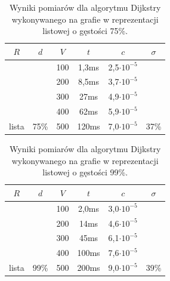 \documentclass[a4paper,12pt]{article}
\begin{document}
\begin{table}[H]
	\centering
	\caption{\centering Wyniki pomiarów dla algorytmu Dijkstry wykonywanego na grafie w reprezentacji listowej o gęstości 75\%.}
	\begin{tabular}{|c|c|c|c|c|c|}
		\hline
		\rowcolor[HTML]{C0C0C0} 
		$R$                     & $d$                    & $V$ & \multicolumn{1}{c|}{\cellcolor[HTML]{C0C0C0}$t$} & $c$                & $\sigma$               \\ \hline
		&                        & 100 & 1,3ms                                            & 2,5$\cdot 10^{-5}$ &                        \\ \cline{3-5}
		&                        & 200 & 8,5ms                                            & 3,7$\cdot 10^{-5}$ &                        \\ \cline{3-5}
		&                        & 300 & 27ms                                             & 4,9$\cdot 10^{-5}$ &                        \\ \cline{3-5}
		&                        & 400 & 62ms                                             & 5,9$\cdot 10^{-5}$ &                        \\ \cline{3-5}
		\multirow{-5}{*}{lista} & \multirow{-5}{*}{75\%} & 500 & 120ms                                            & 7,0$\cdot 10^{-5}$ & \multirow{-5}{*}{37\%} \\ \hline
	\end{tabular}
\end{table}

\begin{table}[H]
	\centering
	\caption{\centering Wyniki pomiarów dla algorytmu Dijkstry wykonywanego na grafie w reprezentacji listowej o gęstości 99\%.}
	\begin{tabular}{|c|c|c|c|c|c|}
		\hline
		\rowcolor[HTML]{C0C0C0} 
		$R$                     & $d$                    & $V$ & \multicolumn{1}{c|}{\cellcolor[HTML]{C0C0C0}$t$} & $c$                & $\sigma$               \\ \hline
		&                        & 100 & 2,0ms                                            & 3,0$\cdot 10^{-5}$ &                        \\ \cline{3-5}
		&                        & 200 & 14ms                                             & 4,6$\cdot 10^{-5}$ &                        \\ \cline{3-5}
		&                        & 300 & 45ms                                             & 6,1$\cdot 10^{-5}$ &                        \\ \cline{3-5}
		&                        & 400 & 100ms                                            & 7,6$\cdot 10^{-5}$ &                        \\ \cline{3-5}
		\multirow{-5}{*}{lista} & \multirow{-5}{*}{99\%} & 500 & 200ms                                            & 9,0$\cdot 10^{-5}$ & \multirow{-5}{*}{39\%} \\ \hline
	\end{tabular}
\end{table}
\end{document}
